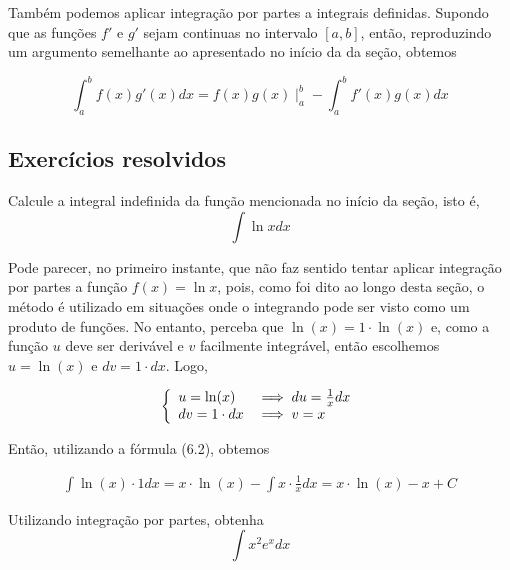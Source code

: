 	Também podemos aplicar integração por partes a integrais definidas. Supondo que as funções $f'$ e $g'$ sejam continuas no intervalo $[a,b]$, então, reproduzindo um argumento semelhante ao apresentado no início da da seção, obtemos 
	
	\begin{equation}
		\boxed{\int_{a}^{b} f(x)g'(x)dx = f(x)g(x)\mid_{a}^{b}- \int_{a}^{b} f'(x)g(x)dx}
	\end{equation}
	 
\subsection*{Exercícios resolvidos}

	\begin{exeresol}
		Calcule a integral indefinida da função mencionada no início da seção, isto é, $$\int \ln x dx$$
	\end{exeresol}
	
	\begin{resol}
		Pode parecer, no primeiro instante, que não faz sentido tentar aplicar integração por partes a função $f(x)= \ln x$, pois, como foi dito ao longo desta seção, o método é utilizado em situações onde o integrando pode ser visto como um produto de funções. No entanto, perceba que $\ln(x) = 1 \cdot \ln (x)$ e, como a função $u$ deve ser derivável e $v$ facilmente integrável, então escolhemos $u = \ln(x)$ e $dv = 1 \cdot dx$.  Logo,
	
		\begin{displaymath}
			\left\{ \begin{array}{ll}
				 u = \ln(x) & \implies \textrm{$du = \frac{1}{x}dx$}\\
				dv = 1 \cdot dx & \implies \textrm{$ v = x$}
			\end{array} \right.
		\end{displaymath}
		
		Então, utilizando a fórmula (6.2), obtemos 
		
		\[\begin{split}
			\int \ln(x) \cdot 1 dx = x \cdot \ln(x) - \int x \cdot \frac{1}{x}dx =  x \cdot \ln(x) - x + C  
		\end{split}\]	
	\end{resol}

	\begin{exeresol}
		Utilizando integração por partes, obtenha $$ \int x^2 e^xdx$$
	\end{exeresol}
	
